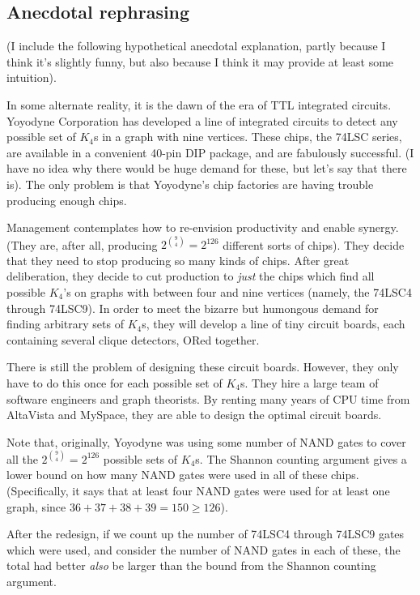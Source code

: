 \documentclass[12pt]{article}
\theoremstyle{definition}
\begin{document}
\subsection{Anecdotal rephrasing}

(I include the following hypothetical anecdotal explanation,
partly because I think it's slightly funny, but also because I think it may
provide at least some intuition).

In some alternate reality, it is the dawn of the era of 
TTL integrated circuits.
Yoyodyne Corporation has developed a line of integrated circuits to detect
any possible set of $K_4$s in a graph with nine vertices.
These chips, the 74LSC series,
are available in a convenient 40-pin DIP package, and are
fabulously successful. (I have no idea why there would be huge demand for
these, but let's say that there is). The only problem is that Yoyodyne's 
chip factories are having trouble producing enough chips.

Management contemplates how to re-envision productivity and enable
synergy. (They are, after all, producing $2^{9 \choose 4} = 2^{126}$
different sorts of chips).
They decide that they need to stop producing so many kinds of chips.
After great deliberation, they decide to cut production to {\em just} the
chips which find all possible
$K_4$'s on graphs with between four and nine vertices (namely, the 74LSC4
through 74LSC9). In order to meet the bizarre but humongous
demand for finding arbitrary sets of $K_4$s, they will develop a
line of tiny circuit boards,
each containing several clique detectors, ORed together.

There is still the problem of designing these circuit boards. However,
they only have to do this once for each possible set of $K_4$s. They hire
a large team of software engineers and graph theorists. By renting
many years of CPU time from AltaVista and MySpace, they are able to design the
optimal circuit boards.

Note that, originally, Yoyodyne was using some number of NAND gates to
cover all the $2^{9 \choose 4} = 2^{126}$ possible sets of $K_4$s.
The Shannon counting
argument gives a lower bound on how many NAND gates were used in all of
these chips. (Specifically, it says that at least four NAND gates
were used for at least one graph, since $36+37+38+39 = 150 \ge 126$).

After the redesign, if 
we count up the number of 74LSC4 through 74LSC9 gates which were used,
and consider the number of NAND gates in each
of these, the total had better {\em also} be larger than the bound from
the Shannon counting argument.
\end{document}
